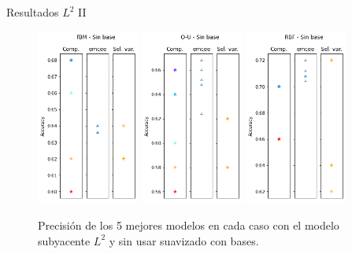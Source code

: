 \documentclass[10pt, spanish, professionalfonts]{beamer}
\begin{document}
\begin{frame}{Resultados \(L^2\) II}
  \begin{figure}
    \includegraphics[width=0.3\textwidth]{img/results/log_l2_fbm_nobase}\hfill
    \includegraphics[width=0.3\textwidth]{img/results/log_l2_ou_nobase}\hfill
    \includegraphics[width=0.3\textwidth]{img/results/log_l2_rbf_nobase}
    \caption{Precisión de los 5 mejores modelos en cada caso con el modelo subyacente \(L^2\) y sin usar suavizado con bases.}
  \end{figure}
\end{frame}
\end{document}
